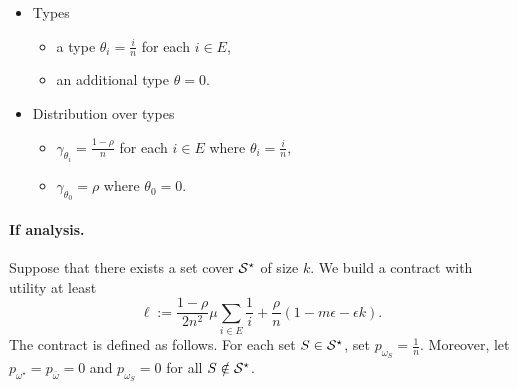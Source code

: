 \begin{itemize}
		\item Types 
		\begin{itemize}
			\item a type $\theta_i=\frac{i}{n}$ for each $i\in E$,
            \item  an additional type $\theta=0$. 
		\end{itemize}
		
		\item Distribution over types
		\begin{itemize}
			\item $\gamma_{\theta_i}=\frac{1-\rho}{n}$ for each $i \in E$ where $\theta_i=\frac{i}{n}$,
            \item  $\gamma_{\theta_0}=\rho$ where $\theta_0=0$.
            \end{itemize}
		
		
	\end{itemize}
    
	\paragraph{\textbf{If analysis.}}
	Suppose that there exists a set cover $\mathcal{S}^\star$ of size $k$.
	We build a contract with utility at least 
	\[
            \ell:= \frac{1-\rho}{2n^2} \mu \sum_{i\in E} \frac{1}{i} + \frac{\rho}{n} (1-m\epsilon -\epsilon k).  
        \]
	The contract is defined as follows.	For each set $S\in \mathcal{S}^\star$, set
	$p_{\omega_S}=\frac{1}{n}$.
	Moreover, let $p_{\omega^\star}=p_{\bar \omega}=0$ and $p_{\omega_S}=0$ for all $S\notin \mathcal{S}^\star$.
	
